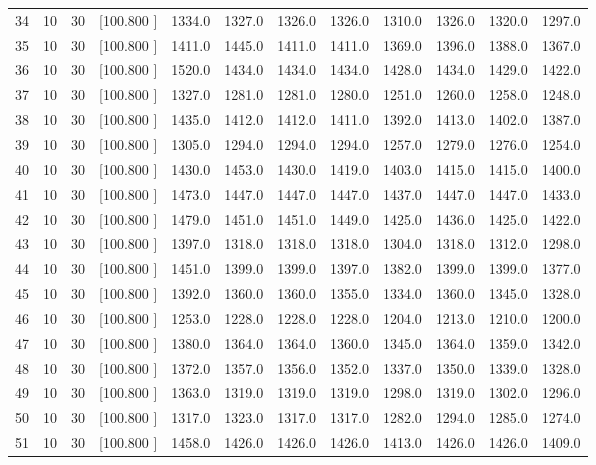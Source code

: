 \documentclass[12pt,a4paper]{article}
\begin{document}
\begin{center}
{\begin{tabular}{r r r r r r r r r r r r}
  34& 10& 30&[100.800   ]&  1334.0&  1327.0&  1326.0&  1326.0&  1310.0&  1326.0&  1320.0&  1297.0\\[-0.02in]
  35& 10& 30&[100.800   ]&  1411.0&  1445.0&  1411.0&  1411.0&  1369.0&  1396.0&  1388.0&  1367.0\\[-0.02in]
  36& 10& 30&[100.800   ]&  1520.0&  1434.0&  1434.0&  1434.0&  1428.0&  1434.0&  1429.0&  1422.0\\[-0.02in]
  37& 10& 30&[100.800   ]&  1327.0&  1281.0&  1281.0&  1280.0&  1251.0&  1260.0&  1258.0&  1248.0\\[-0.02in]
  38& 10& 30&[100.800   ]&  1435.0&  1412.0&  1412.0&  1411.0&  1392.0&  1413.0&  1402.0&  1387.0\\[-0.02in]
  39& 10& 30&[100.800   ]&  1305.0&  1294.0&  1294.0&  1294.0&  1257.0&  1279.0&  1276.0&  1254.0\\[-0.02in]
  40& 10& 30&[100.800   ]&  1430.0&  1453.0&  1430.0&  1419.0&  1403.0&  1415.0&  1415.0&  1400.0\\[-0.02in]
  41& 10& 30&[100.800   ]&  1473.0&  1447.0&  1447.0&  1447.0&  1437.0&  1447.0&  1447.0&  1433.0\\[-0.02in]
  42& 10& 30&[100.800   ]&  1479.0&  1451.0&  1451.0&  1449.0&  1425.0&  1436.0&  1425.0&  1422.0\\[-0.02in]
  43& 10& 30&[100.800   ]&  1397.0&  1318.0&  1318.0&  1318.0&  1304.0&  1318.0&  1312.0&  1298.0\\[-0.02in]
  44& 10& 30&[100.800   ]&  1451.0&  1399.0&  1399.0&  1397.0&  1382.0&  1399.0&  1399.0&  1377.0\\[-0.02in]
  45& 10& 30&[100.800   ]&  1392.0&  1360.0&  1360.0&  1355.0&  1334.0&  1360.0&  1345.0&  1328.0\\[-0.02in]
  46& 10& 30&[100.800   ]&  1253.0&  1228.0&  1228.0&  1228.0&  1204.0&  1213.0&  1210.0&  1200.0\\[-0.02in]
  47& 10& 30&[100.800   ]&  1380.0&  1364.0&  1364.0&  1360.0&  1345.0&  1364.0&  1359.0&  1342.0\\[-0.02in]
  48& 10& 30&[100.800   ]&  1372.0&  1357.0&  1356.0&  1352.0&  1337.0&  1350.0&  1339.0&  1328.0\\[-0.02in]
  49& 10& 30&[100.800   ]&  1363.0&  1319.0&  1319.0&  1319.0&  1298.0&  1319.0&  1302.0&  1296.0\\[-0.02in]
  50& 10& 30&[100.800   ]&  1317.0&  1323.0&  1317.0&  1317.0&  1282.0&  1294.0&  1285.0&  1274.0\\[-0.02in]
  51& 10& 30&[100.800   ]&  1458.0&  1426.0&  1426.0&  1426.0&  1413.0&  1426.0&  1426.0&  1409.0\\[-0.02in]

\end{tabular}}
\end{center}
\end{document}
